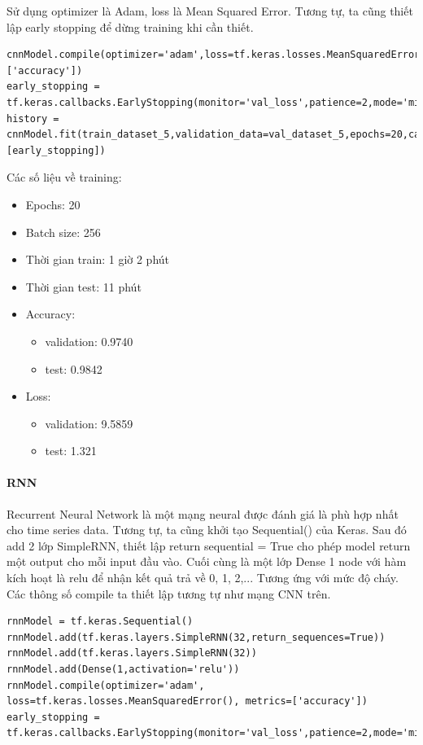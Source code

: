 \documentclass{article}
\begin{document}
Sử dụng optimizer là Adam, loss là Mean Squared Error. Tương tự, ta cũng thiết lập early stopping để dừng training khi cần thiết. 

\begin{verbatim}
cnnModel.compile(optimizer='adam',loss=tf.keras.losses.MeanSquaredError(),metrics=['accuracy'])
early_stopping = tf.keras.callbacks.EarlyStopping(monitor='val_loss',patience=2,mode='min')
history = cnnModel.fit(train_dataset_5,validation_data=val_dataset_5,epochs=20,callbacks=[early_stopping])
\end{verbatim}

Các số liệu về training:
\begin{itemize}
	\item Epochs: 20
	\item Batch size: 256
	\item Thời gian train: 1 giờ 2 phút
	\item Thời gian test: 11 phút
	\item Accuracy:
	\begin{itemize}
	    \item validation: 0.9740
	    \item test: 0.9842
	\end{itemize}
	\item Loss:
	\begin{itemize}
	    \item validation: 9.5859
	    \item test: 1.321
	\end{itemize}
\end{itemize}

\paragraph{RNN} Recurrent Neural Network là một mạng neural được đánh giá là phù hợp nhất cho time series data. Tương tự, ta cũng khởi tạo Sequential() của Keras. Sau đó add 2 lớp SimpleRNN, thiết lập return sequential = True cho phép model return một output cho mỗi input đầu vào. Cuối cùng là một lớp Dense 1 node với hàm kích hoạt là relu để nhận kết quả trả về 0, 1, 2,... Tương ứng với mức độ cháy. Các thông số compile ta thiết lập tương tự như mạng CNN trên. 

\begin{verbatim}
rnnModel = tf.keras.Sequential()
rnnModel.add(tf.keras.layers.SimpleRNN(32,return_sequences=True))
rnnModel.add(tf.keras.layers.SimpleRNN(32))
rnnModel.add(Dense(1,activation='relu'))
rnnModel.compile(optimizer='adam', loss=tf.keras.losses.MeanSquaredError(), metrics=['accuracy'])
early_stopping = tf.keras.callbacks.EarlyStopping(monitor='val_loss',patience=2,mode='min')
\end{verbatim}
\end{document}
